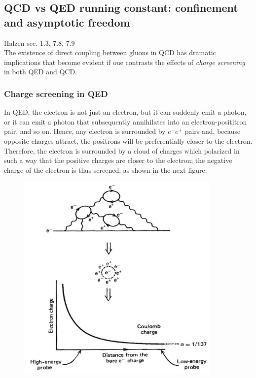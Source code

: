 \documentclass[TheoreticalPhy_ModB.tex]{subfiles}
\begin{document}
\subsection{QCD vs QED running constant: confinement and asymptotic freedom}
\textsf{Halzen sec. 1.3, 7.8, 7.9}\\

The existence of direct coupling between gluons in QCD has dramatic implications that become evident if oue contrasts the effects of \emph{charge screening} in both QED and QCD. 

\subsubsection{Charge screening in QED}

In QED, the electron is not just an electron, but it can suddenly emit a photon, or it can emit a photon that subsequently annihilates into an electron-posititron pair, and so on. Hence, any electron is surrounded by $e^-e^+$ pairs and, because opposite charges attract, the positrons will be preferentially closer to the electron. Therefore, the electron is surrounded by a cloud of charges which polarized in such a way that the positive charges are closer to the electron; the negative charge of the electron is thus screened, as shown in the next figure:

\begin{figure}[H]
\centering
\includegraphics[width=10cm]{img/Running-coupling-constant-QED.jpg}
\end{figure}
\end{document}
